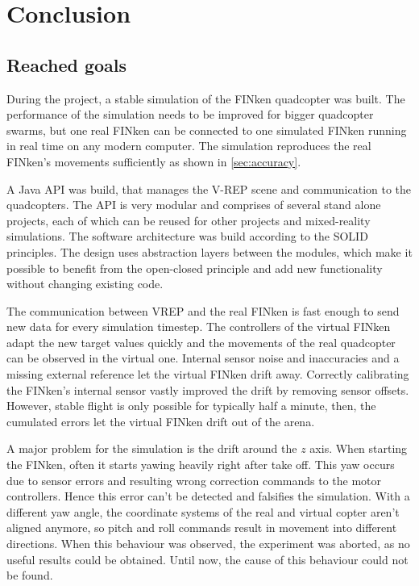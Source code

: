 \chapter{Conclusion}
\label{sec:conclusion}

\section{Reached goals}
During the project, a stable simulation of the FINken quadcopter was built.
The performance of the simulation needs to be improved for bigger quadcopter swarms, but one real FINken can be connected to one simulated FINken running in real time on any modern computer.
The simulation reproduces the real FINken's movements sufficiently as shown in \ref{sec:accuracy}.

A Java API was build, that manages the V-REP scene and communication to the quadcopters. 
The API is very modular and comprises of several stand alone projects, each of which can be reused for other projects and mixed-reality simulations. The software architecture was build according to the  SOLID \cite{solid} principles.
The design uses abstraction layers between the modules, which make it possible to benefit from the open-closed principle and add new functionality without changing existing code.

The communication between VREP and the real FINken is fast enough to send new data for every simulation timestep.
The controllers of the virtual FINken adapt the new target values quickly and the movements of the real quadcopter can be observed in the virtual one.
Internal sensor noise and inaccuracies and a missing external reference let the virtual FINken drift away.
Correctly calibrating the FINken's internal sensor vastly improved the drift by removing sensor offsets.
However, stable flight is only possible for typically half a minute, then, the cumulated errors let the virtual FINken drift out of the arena.

A major problem for the simulation is the drift around the $z$ axis.
When starting the FINken, often it starts yawing heavily right after take off.
This yaw occurs due to sensor errors and resulting wrong correction commands to the motor controllers.
Hence this error can't be detected and falsifies the simulation.
With a different yaw angle, the coordinate systems of the real and virtual copter aren't aligned anymore, so pitch and roll commands result in movement into different directions.
When this behaviour was observed, the experiment was aborted, as no useful results could be obtained.
Until now, the cause of this behaviour could not be found.





